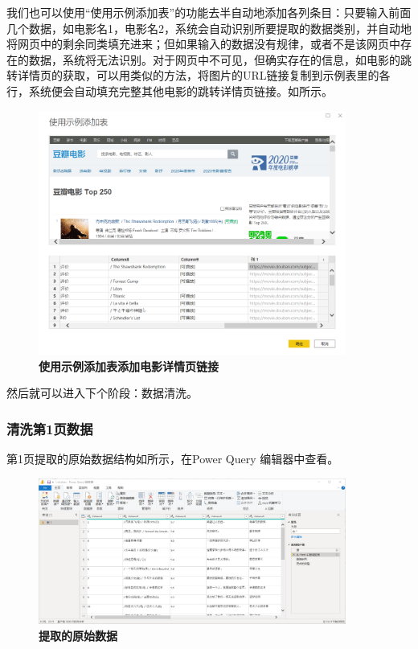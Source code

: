 我们也可以使用``使用示例添加表''的功能去半自动地添加各列条目：只要输入前面几个数据，如电影名1，电影名2，系统会自动识别所要提取的数据类别，并自动地将网页中的剩余同类填充进来；但如果输入的数据没有规律，或者不是该网页中存在的数据，系统将无法识别。对于网页中不可见，但确实存在的信息，如电影的跳转详情页的获取，可以用类似的方法，将图片的URL链接复制到示例表里的各行，系统便会自动填充完整其他电影的跳转详情页链接。如所示。

\begin{figure}[htbp]
    \centering
    \includegraphics[width=0.9\textwidth]{figure/PowerBI/douban_example_table.png}
    \caption{\textbf{使用示例添加表添加电影详情页链接}}
    \label{fig:douban_example_table}
\end{figure}

然后就可以进入下个阶段：数据清洗。

\subsubsection{清洗第1页数据}

第1页提取的原始数据结构如所示，在Power Query 编辑器中查看。

\begin{figure}[htbp]
    \centering
    \includegraphics[width=0.9\textwidth]{figure/PowerBI/douban_raw_data_power_query.png}
    \caption{\textbf{提取的原始数据}}
    \label{fig:douban_raw_data_power_query}
\end{figure}

